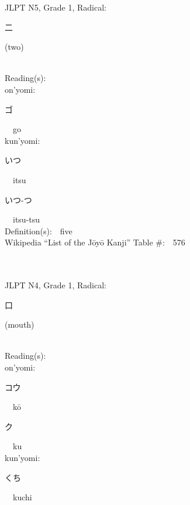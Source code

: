 \begin{multicols}{2}
{JLPT N5, Grade 1, Radical:\ \ {\begin{CJK}{UTF8}{min} 二 \end{CJK}} (two) } \\
Reading(s):\ \ \\
{\hspace*{1em}}on'yomi:\ \ \\
{\hspace*{2em}}{\begin{CJK}{UTF8}{min} ゴ \end{CJK}}\ \ go\ \ \\
{\hspace*{1em}}kun'yomi:\ \ \\
{\hspace*{2em}}{\begin{CJK}{UTF8}{min} いつ \end{CJK}}\ \ itsu\ \ \\
{\hspace*{2em}}{\begin{CJK}{UTF8}{min} いつ-つ \end{CJK}}\ \ itsu-tsu\ \ \\
Definition(s):\ \ five \\
Wikipedia ``List of the J\=oy\=o Kanji'' Table \#:\ \ 576 \\
\ \ \\
{\fontsize{34pt}{40pt}  }\ \ \\  %
{JLPT N4, Grade 1, Radical:\ \ {\begin{CJK}{UTF8}{min} 口 \end{CJK}} (mouth) } \\
Reading(s):\ \ \\
{\hspace*{1em}}on'yomi:\ \ \\
{\hspace*{2em}}{\begin{CJK}{UTF8}{min} コウ \end{CJK}}\ \ k\=o\ \ \\
{\hspace*{2em}}{\begin{CJK}{UTF8}{min} ク \end{CJK}}\ \ ku\ \ \\
{\hspace*{1em}}kun'yomi:\ \ \\
{\hspace*{2em}}{\begin{CJK}{UTF8}{min} くち \end{CJK}}\ \ kuchi\ \ \\

\end{multicols}
